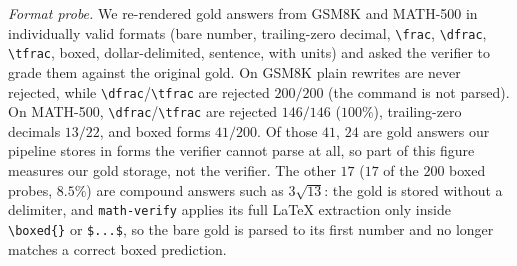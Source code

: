 \documentclass[runningheads]{llncs}
\begin{document}
\emph{Format probe.} We re-rendered gold answers from GSM8K and MATH-500 in
individually valid formats (bare number, trailing-zero decimal, \verb|\frac|,
\verb|\dfrac|, \verb|\tfrac|, boxed, dollar-delimited, sentence, with units) and
asked the verifier to grade them against the original gold. On GSM8K plain
rewrites are never rejected, while \verb|\dfrac|/\verb|\tfrac| are rejected
$200/200$ (the command is not parsed). On MATH-500, \verb|\dfrac|/\verb|\tfrac|
are rejected $146/146$ ($100\%$), trailing-zero decimals $13/22$, and boxed forms
$41/200$. Of those $41$, $24$ are gold answers our pipeline stores in forms the
verifier cannot parse at all, so part of this figure measures our gold storage,
not the verifier. The other $17$ ($17$ of the $200$ boxed probes, $8.5\%$) are
compound answers such as $3\sqrt{13}$: the gold is stored without a delimiter,
and \texttt{math-verify} applies its full \LaTeX{} extraction only inside
\verb|\boxed{}| or \verb|$...$|, so the bare gold is parsed to its first number
and no longer matches a correct boxed prediction.
\end{document}

